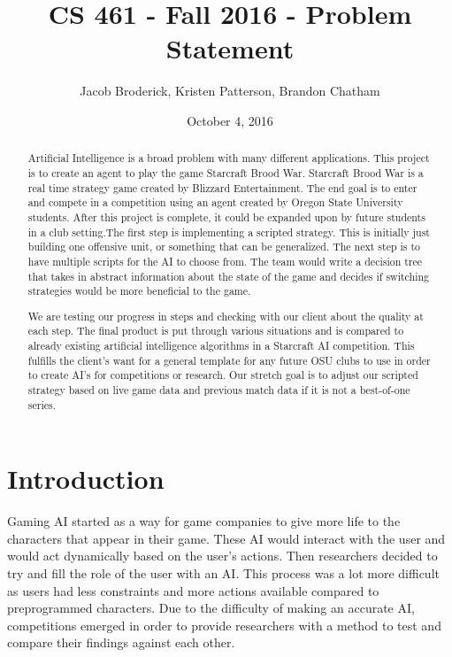 \documentclass[10pt,letterpaper,onecolumn,draftclsnofoot]{IEEEtran}
\begin{document}
\begin{titlepage}
  \title{CS 461 - Fall 2016 - Problem Statement}
  \author{Jacob Broderick, Kristen Patterson, Brandon Chatham}
  \date{October 4, 2016}
  \maketitle
  \vspace{4cm}
  \begin{abstract}
  	\noindent 
  	Artificial Intelligence is a broad problem with many different applications. This project is to create an agent to play the game Starcraft Brood War. Starcraft Brood War is a real time strategy game created by Blizzard Entertainment. The end goal is to enter and compete in a competition using an agent created by Oregon State University students. After this project is complete, it could be expanded upon by future students in a club setting.The first step is implementing a scripted strategy. This is initially just building one offensive unit, or something that can be generalized. The next step is to have multiple scripts for the AI to choose from. The team would write a decision tree that takes in abstract information about the state of the game and decides if switching strategies would be more beneficial to the game.
  	
  	We are testing our progress in steps and checking with our client about the quality at each step. The final product is put through various situations and is compared to already existing artificial intelligence algorithms in a Starcraft AI competition. This fulfills the client's want for a general template for any future OSU clubs to use in order to create AI's for competitions or research. Our stretch goal is to adjust our scripted strategy based on live game data and previous match data if it is not a best-of-one series. 
  \end{abstract}
\end{titlepage}
\section{Introduction}
Gaming AI started as a way for game companies to give more life to the characters that appear in their game. These AI would interact with the user and would act dynamically based on the user's actions. Then researchers decided to try and fill the role of the user with an AI. This process was a lot more difficult as users had less constraints and more actions available compared to preprogrammed characters. Due to the difficulty of making an accurate AI, competitions emerged in order to provide researchers with a method to test and compare their findings against each other.
\end{document}
